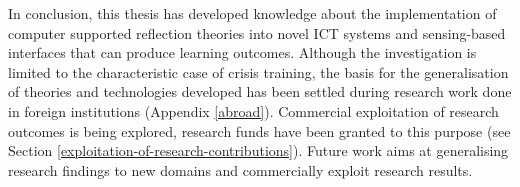 In conclusion, this thesis has developed knowledge about the implementation of computer supported reflection theories into novel ICT systems and sensing-based interfaces that can produce learning outcomes. Although the investigation is limited to the characteristic case of crisis training, the basis for the generalisation of theories and technologies developed has been settled during research work done in foreign institutions (Appendix \ref{abroad}). Commercial exploitation of research outcomes is being explored, research funds have been granted to this purpose (see Section \ref{exploitation-of-research-contributions}). Future work aims at generalising research findings to new domains and commercially exploit research results. 
